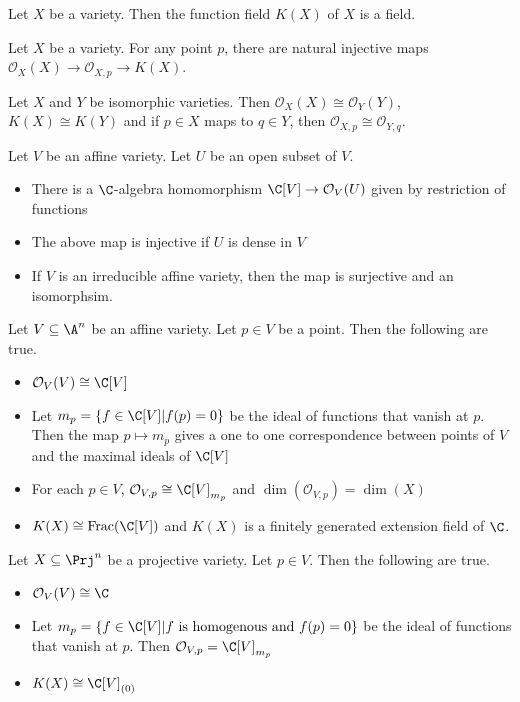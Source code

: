 \documentclass[a4paper]{article}
\begin{document}
\begin{lmm}{}{} Let $X$ be a variety. Then the function field $K(X)$ of $X$ is a field. 
\end{lmm}

\begin{lmm}{}{} Let $X$ be a variety. For any point $p$, there are natural injective maps $\mathcal{O}_X(X)\to\mathcal{O}_{X,p}\to K(X)$. 
\end{lmm}

\begin{prp}{}{} Let $X$ and $Y$ be isomorphic varieties. Then $\mathcal{O}_X(X)\cong\mathcal{O}_Y(Y)$, $K(X)\cong K(Y)$ and if $p\in X$ maps to $q\in Y$, then $\mathcal{O}_{X,p}\cong\mathcal{O}_{Y,q}$. 
\end{prp}

\begin{thm}{}{} Let $V$ be an affine variety. Let $U$ be an open subset of $V$. 
\begin{itemize}
\item There is a $\C$-algebra homomorphism $\C[V]\to\mathcal{O}_V(U)$ given by restriction of functions
\item The above map is injective if $U$ is dense in $V$
\item If $V$ is an irreducible affine variety, then the map is surjective and an isomorphsim. 
\end{itemize}
\end{thm}

\begin{thm}{}{} Let $V\subseteq\A^n$ be an affine variety. Let $p\in V$ be a point. Then the following are true. 
\begin{itemize}
\item $\mathcal{O}_V(V)\cong\C[V]$
\item Let $m_p=\{f\in\C[V]|f(p)=0\}$ be the ideal of functions that vanish at $p$. Then the map $p\mapsto m_p$ gives a one to one correspondence between points of $V$ and the maximal ideals of $\C[V]$
\item For each $p\in V$, $\mathcal{O}_{V,p}\cong\C[V]_{m_p}$ and $\dim(\mathcal{O}_{V,p})=\dim(X)$
\item $K(X)\cong\text{Frac}(\C[V])$ and $K(X)$ is a finitely generated extension field of $\C$. 
\end{itemize}
\end{thm}

\begin{thm}{}{} Let $X\subseteq\Prj^n$ be a projective variety. Let $p\in V$. Then the following are true. 
\begin{itemize}
\item $\mathcal{O}_V(V)\cong\C$
\item Let $m_p=\{f\in\C[V]|f\text{ is homogenous and }f(p)=0\}$ be the ideal of functions that vanish at $p$. Then $\mathcal{O}_{V,p}=\C[V]_{m_p}$
\item $K(X)\cong\C[V]_{(0)}$
\end{itemize}
\end{thm}
\end{document}
